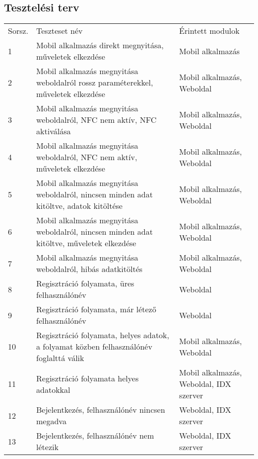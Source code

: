\subsection{Tesztelési terv}

\begin{tabular}{|p{1cm}|p{8cm} |p{4cm}|}
  \hline
\rowcolor{Title}
\multicolumn{3}{ |c| }{\color{white} Teszteset leírása} \\
  \hline
\rowcolor{Header}
Sorsz. & Teszteset név & Érintett modulok\tabularnewline
\hline 
  1 & Mobil alkalmazás direkt megnyitása, műveletek elkezdése & Mobil alkalmazás  \tabularnewline
  \hline
  2  & Mobil alkalmazás megnyitása weboldalról rossz paraméterekkel, műveletek elkezdése & Mobil alkalmazás, Weboldal  \tabularnewline
  \hline
 3  & Mobil alkalmazás megnyitása weboldalról, NFC nem aktív, NFC aktiválása & Mobil alkalmazás, Weboldal  \tabularnewline
  \hline
 4  & Mobil alkalmazás megnyitása weboldalról, NFC nem aktív, műveletek elkezdése & Mobil alkalmazás, Weboldal  \tabularnewline
  \hline
 5  & Mobil alkalmazás megnyitása weboldalról, nincsen minden adat kitöltve, adatok kitöltése & Mobil alkalmazás, Weboldal  \tabularnewline
  \hline
 6  & Mobil alkalmazás megnyitása weboldalról, nincsen minden adat kitöltve, műveletek elkezdése & Mobil alkalmazás, Weboldal  \tabularnewline
  \hline
 7  & Mobil alkalmazás megnyitása weboldalról, hibás adatkitöltés & Mobil alkalmazás, Weboldal  \tabularnewline
  \hline
 8  & Regisztráció folyamata, üres felhasználónév &  Weboldal  \tabularnewline
  \hline
 9  & Regisztráció folyamata, már létező felhasználónév &  Weboldal  \tabularnewline
  \hline
 10  & Regisztráció folyamata, helyes adatok, a folyamat közben felhasználónév foglalttá válik &   Mobil alkalmazás, Weboldal \tabularnewline
  \hline
 11  & Regisztráció folyamata helyes adatokkal & Mobil alkalmazás, Weboldal, IDX szerver  \tabularnewline
  \hline
 12  & Bejelentkezés, felhasználónév nincsen megadva & Weboldal, IDX szerver \tabularnewline
  \hline
 13  & Bejelentkezés, felhasználónév nem létezik & Weboldal, IDX szerver \tabularnewline
  \hline
\end{tabular}

